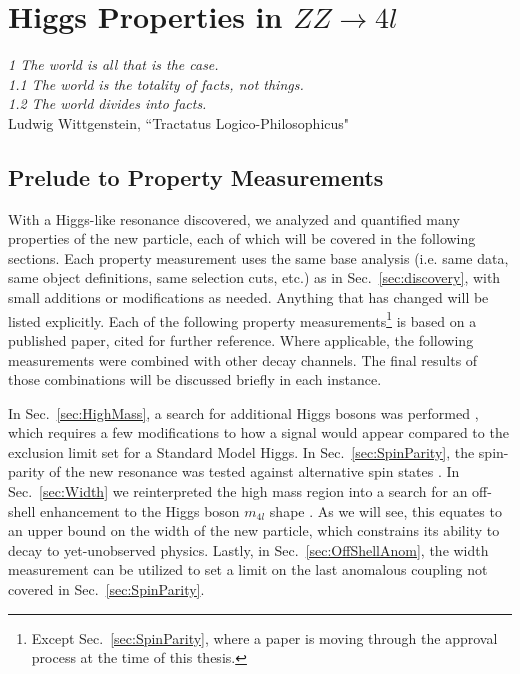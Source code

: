 \chapter{Higgs Properties in $ZZ\rightarrow4l$}
\label{sec:properties}

\begin{center}
\begin{footnotesize}
\textit{1 The world is all that is the case. \\
1.1 The world is the totality of facts, not things.\\
1.2 The world divides into facts.}\\
Ludwig Wittgenstein, ``Tractatus Logico-Philosophicus"
\end{footnotesize}
\end{center}

\section{Prelude to Property Measurements}
\label{sec:Prelude}

With a Higgs-like resonance discovered, we analyzed and quantified many properties of the new particle, each of which will be covered in the following sections. Each property measurement uses the same base analysis (i.e. same data, same object definitions, same selection cuts, etc.) as in Sec.~\ref{sec:discovery}, with small additions or modifications as needed. Anything that has changed will be listed explicitly. Each of the following property measurements\footnote{Except Sec.~\ref{sec:SpinParity}, where a paper is moving through the approval process at the time of this thesis.} is based on a published paper, cited for further reference. Where applicable, the following measurements were combined with other decay channels. The final results of those combinations will be discussed briefly in each instance.

In Sec.~\ref{sec:HighMass}, a search for additional Higgs bosons was performed \cite{Khachatryan:2015cwa}, which requires a few modifications to how a signal would appear compared to the exclusion limit set for a Standard Model Higgs. In Sec.~\ref{sec:SpinParity}, the spin-parity of the new resonance was tested against alternative spin states \cite{Khachatryan:2014kca}. In Sec.~\ref{sec:Width} we reinterpreted the high mass region into a search for an off-shell enhancement to the Higgs boson $m_{4l}$ shape \cite{Khachatryan:2014iha}. As we will see, this equates to an upper bound on the width of the new particle, which constrains its ability to decay to yet-unobserved physics. Lastly, in Sec.~\ref{sec:OffShellAnom}, the width measurement can be utilized to set a limit on the last anomalous coupling not covered in Sec.~\ref{sec:SpinParity}.

